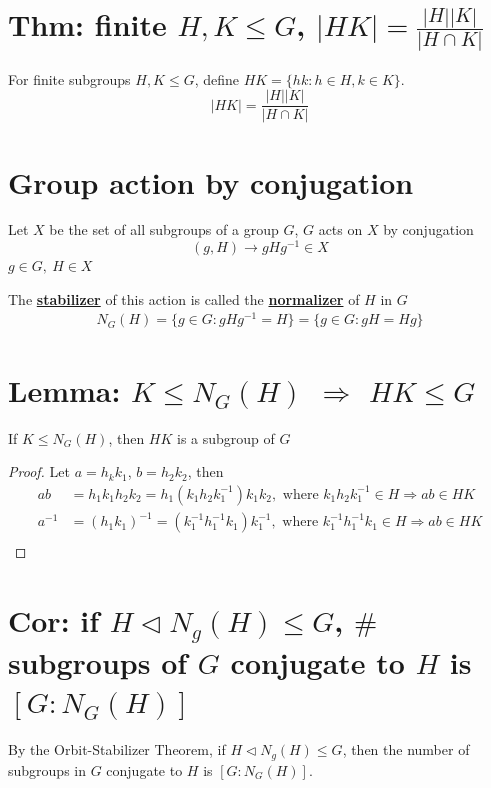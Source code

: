 \documentclass[11pt]{elegantbook}
\begin{document}
\section{Thm: finite $H,K\leq G$, $|HK|=\frac{|H||K|}{|H\cap K|}$}
\begin{proposition}
    For finite subgroups $H,K\leq G$, define $HK=\{hk:h\in H,k\in K\}$.
    $$|HK|=\frac{|H||K|}{|H\cap K|}$$
\end{proposition}

\section{Group action by conjugation}
\begin{definition}
    Let $X$ be the set of all subgroups of a group $G$, $G$ acts on $X$ by conjugation $$(g,H) \rightarrow gHg^{-1}\in X$$
    $g\in G,\ H\in X$
\end{definition}

The \underline{\textbf{stabilizer}} of this action is called the \underline{\textbf{normalizer}} of $H$ in $G$
\begin{equation}
    \begin{aligned}
        N_G(H)=\{g\in G: gHg^{-1}=H\}=\{g\in G: gH=Hg\}
    \end{aligned}
    \nonumber
\end{equation}

\section{Lemma: $K\leq N_G(H)$ $\Rightarrow$ $HK\leq G$}
\begin{lemma}
    If $K\leq N_G(H)$, then $HK$ is a subgroup of $G$
\end{lemma}
\begin{proof}
Let $a=h_kk_1$, $b=h_2k_2$, then
\begin{equation}
    \begin{aligned}
        ab&=h_1k_1h_2k_2=h_1(k_1h_2k_1^{-1})k_1k_2, \text{ where }k_1h_2k_1^{-1}\in H \Rightarrow ab\in HK\\
        a^{-1}&=(h_1k_1)^{-1}=(k_1^{-1}h_1^{-1}k_1)k_1^{-1}, \text{ where }k_1^{-1}h_1^{-1}k_1\in H \Rightarrow ab\in HK\\
    \end{aligned}
    \nonumber
\end{equation}
\end{proof}

\section{Cor: if $H \lhd N_g(H)\leq G$, $\#$ subgroups of $G$ conjugate to $H$ is $[G: N_G(H)]$}
\begin{corollary}
    By the Orbit-Stabilizer Theorem, if $H \lhd N_g(H)\leq G$, then the number of subgroups in $G$ conjugate to $H$ is $[G: N_G(H)]$.
\end{corollary}
\end{document}
